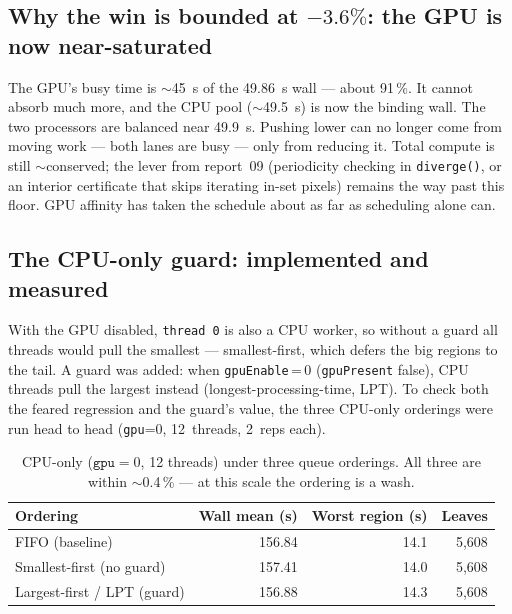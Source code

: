 \documentclass[
	english,
	letterpaper, oneside
]{article}
\begin{document}
\subsection{Why the win is bounded at $-3.6\%$: the GPU is now near-saturated}

The GPU's busy time is $\sim$45~s of the 49.86~s wall --- about 91\,\%. It cannot
absorb much more, and the CPU pool ($\sim$49.5~s) is now the binding wall. The
two processors are balanced near 49.9~s. Pushing lower can no longer come from
moving work --- both lanes are busy --- only from reducing it.
Total compute is still $\sim$conserved; the lever from report~09 (periodicity
checking in \texttt{diverge()}, or an interior certificate that skips iterating
in-set pixels) remains the way past this floor. GPU affinity has taken the
schedule about as far as scheduling alone can.

\subsection{The CPU-only guard: implemented and measured}

With the GPU disabled, \texttt{thread~0} is also a CPU worker, so without a guard
all threads would pull the smallest --- smallest-first, which defers the big
regions to the tail. A guard was added: when \texttt{gpuEnable}\,=\,0
(\texttt{gpuPresent} false), CPU threads pull the largest instead
(longest-processing-time, LPT). To check both the feared regression and the
guard's value, the three CPU-only orderings were run head to head (\texttt{gpu}=0,
12~threads, 2~reps each).

\begin{table}[H]
    \centering
    \caption{CPU-only ($\texttt{gpu}=0$, 12 threads) under three queue orderings.
             All three are within $\sim$0.4\,\% --- at this scale the ordering is a
             wash.}
    \label{tab:cpu-only}
    \begin{tabular}{lrrr}
        \hline
        Ordering & Wall mean (s) & Worst region (s) & Leaves \\
        \hline
        FIFO (baseline)               & 156.84 & 14.1 & 5{,}608 \\
        Smallest-first (no guard)     & 157.41 & 14.0 & 5{,}608 \\
        Largest-first / LPT (guard)   & 156.88 & 14.3 & 5{,}608 \\
        \hline
    \end{tabular}
\end{table}
\end{document}
